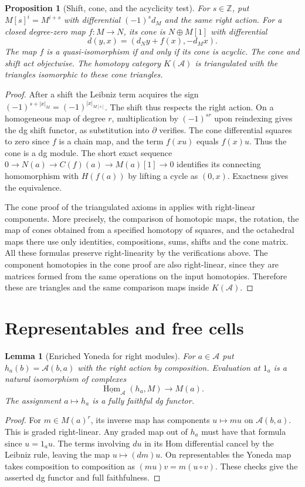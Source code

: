 \documentclass[11pt,oneside,openany]{book}
\newtheorem{lemma}[theorem]{Lemma}
\newtheorem{proposition}[theorem]{Proposition}
\theoremstyle{definition}
\theoremstyle{remark}
\begin{document}
\begin{proposition}[Shift, cone, and the acyclicity test]\label{res:G04}
For \(s\in\mathbb Z\), put \(M[s]^i=M^{i+s}\) with differential
\((-1)^s d_M\) and the same right action. For a closed degree-zero
map \(f:M\to N\), its cone is \(N\oplus M[1]\) with differential
\[
 d(y,x)=(d_N y+f(x),-d_M x).
\]
The map \(f\) is a quasi-isomorphism if and only if its cone is
acyclic. The cone and shift act objectwise. The homotopy category
\(K(\mathcal A)\) is triangulated with the triangles isomorphic to
these cone triangles.
\end{proposition}
\begin{proof}
After a shift the Leibniz term acquires the sign
\((-1)^{s+|x|_M}=(-1)^{|x|_{M[s]}}\). The shift thus respects the
right action. On a homogeneous map of degree \(r\), multiplication
by \((-1)^{sr}\) upon reindexing gives the dg shift functor, as
substitution into \(\partial\) verifies. The cone differential
squares to zero since \(f\) is a chain map, and the term \(f(xu)\)
equals \(f(x)u\). Thus the cone is a dg module. The short exact
sequence \(0\to N(a)\to C(f)(a)\to M(a)[1]\to 0\) identifies
its connecting homomorphism with \(H(f(a))\) by lifting a cycle
as \((0,x)\). Exactness gives the equivalence.

The cone proof of the triangulated axioms in
\cite[K01--K06]{ha-core} applies with right-linear components.
More precisely, the comparison of homotopic maps, the rotation,
the map of cones obtained from a specified homotopy of squares,
and the octahedral maps there use only identities, compositions,
sums, shifts and the cone matrix. All these formulas preserve
right-linearity by the verifications above. The component
homotopies in the cone proof are also right-linear, since they
are matrices formed from the same operations on the input
homotopies. Therefore these are triangles and the same comparison
maps inside \(K(\mathcal A)\).
\end{proof}

\section{Representables and free cells}

\begin{lemma}[Enriched Yoneda for right modules]\label{res:G05}
For \(a\in\mathcal A\) put \(h_a(b)=\mathcal A(b,a)\) with the
right action by composition. Evaluation at \(1_a\) is a natural
isomorphism of complexes
\[
     \underline{\operatorname{Hom}}_{\mathcal A}(h_a,M)
        \longrightarrow M(a).
\]
The assignment \(a\mapsto h_a\) is a fully faithful dg functor.
\end{lemma}
\begin{proof}
For \(m\in M(a)^r\), its inverse map has components
\(u\mapsto m u\) on \(\mathcal A(b,a)\). This is graded right-linear.
Any graded map out of \(h_a\) must have that formula since
\(u=1_a u\). The terms involving \(d u\) in its Hom differential
cancel by the Leibniz rule, leaving the map \(u\mapsto (d m)u\).
On representables the Yoneda map takes composition to composition
as \((m u)v=m(u\circ v)\). These checks give the asserted dg
functor and full faithfulness.
\end{proof}
\end{document}
